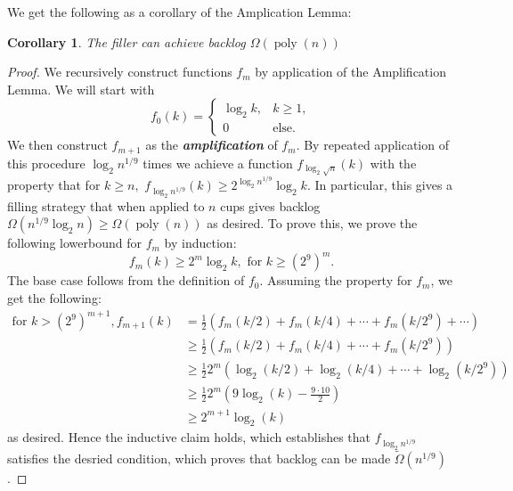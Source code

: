 \documentclass{article}[11pt]
\newcommand{\defn}[1]{{\textit{\textbf{\boldmath #1}}}}
\DeclareMathOperator{\poly}{\text{poly}}
\newtheorem{corollary}{Corollary}
\begin{document}
We get the following as a corollary of the Amplication Lemma:
\begin{corollary}
  The filler can achieve backlog $\Omega(\poly(n))$
\end{corollary}
\begin{proof}
  We recursively construct functions $f_m$ by application of the Amplification
  Lemma. We will start with 
  $$f_0(k) = 
  \begin{cases} 
    \log_2 k, & k\geq 1, \\
    0 & \text{else.}
  \end{cases}$$
    We then construct $f_{m+1}$ as the
  \defn{amplification} of $f_m$.  
  By repeated application of this procedure $\log_2 n^{1/9}$ times we 
  achieve a function $f_{\log_2 \sqrt{n}}(k)$ with the property that for $k \geq n,$
  $f_{\log_2 n^{1/9}}(k) \geq 2^{\log_2 n^{1/9}} \log_2 k$. In particular, this gives a filling strategy 
  that when applied to $n$ cups gives backlog $\Omega(n^{1/9}\log_2 n) \ge \Omega(\poly(n))$ as desired.
  To prove this, we prove the following lowerbound for $f_m$ by induction:
  $$f_m(k) \geq 2^m \log_2 k, \text{ for } k \geq (2^9)^m.$$
  The base case follows from the definition of $f_0$. Assuming the property for $f_m$, we get the following:
  \begin{align}
    \text{for } k > (2^9)^{m+1}, f_{m+1}(k) &= \frac{1}{2}(f_m(k/2) + f_m(k/4) + \cdots + f_m(k/2^9) + \cdots)\\
  &\geq \frac{1}{2}(f_m(k/2) + f_m(k/4) + \cdots + f_m(k/2^9))\\
  &\geq \frac{1}{2}2^m(\log_2 (k/2) + \log_2(k/4) + \cdots + \log_2(k/2^9))\\
  &\geq \frac{1}{2}2^m(9\log_2 (k) - \frac{9 \cdot 10}{2}) \label{step:readydrop}\\
  &\geq 2^{m+1} \log_2(k) \label{step:dropped}
  \end{align}
  as desired. Hence the inductive claim holds, which establishes that $f_{\log_2
  n^{1/9}}$ satisfies the desried condition, which proves that backlog can be
  made $\tilde{\Omega}(n^{1/9})$.


\end{proof}
\end{document}
